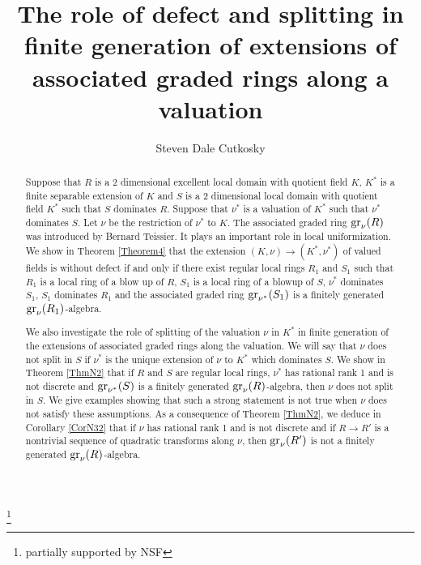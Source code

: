 \documentclass[11pt]{amsart}
\begin{document}
\title{The role of defect and splitting in finite generation of extensions of associated graded rings along a valuation}
\author{Steven Dale Cutkosky}
\thanks{partially supported by NSF}

\address{Steven Dale Cutkosky, Department of Mathematics,
University of Missouri, Columbia, MO 65211, USA}




\begin{abstract}
Suppose that $R$ is a 2 dimensional excellent local domain with quotient field $K$,  $K^*$ is a finite separable extension of $K$ and $S$ is a 2 dimensional local domain with quotient field
$K^*$ such that  $S$ dominates $R$. 
Suppose that $\nu^*$ is a valuation of $K^*$ such that 
 $\nu^*$ dominates $S$. Let $\nu$ be the restriction of $\nu^*$ to $K$.  The associated graded ring ${\rm gr}_{\nu}(R)$  was introduced by Bernard Teissier.  It plays an important role in local uniformization. We show in Theorem \ref{Theorem4} that the extension $(K,\nu)\rightarrow (K^*,\nu^*)$ of valued fields is without defect if and only if there exist regular local rings $R_1$ and $S_1$ such that
 $R_1$ is a local ring of a blow up of $R$, $S_1$ is a local ring of a blowup of $S$, $\nu^*$ dominates $S_1$, $S_1$ dominates $R_1$ and the associated graded ring  ${\rm gr}_{\nu^*}(S_1)$ is a finitely generated ${\rm gr}_{\nu}(R_1)$-algebra.
 
 We also investigate the role of splitting of the valuation $\nu$ in $K^*$ in finite generation of the extensions of associated graded rings along the valuation. We will say that $\nu$ does not split in $S$ if $\nu^*$ is the unique extension of $\nu$ to $K^*$ which  dominates $S$. We show  in Theorem \ref{ThmN2} that if $R$ and $S$ are regular local rings, $\nu^*$ has rational rank 1 and is not discrete and ${\rm gr}_{\nu^*}(S)$ is a finitely generated ${\rm gr}_{\nu}(R)$-algebra, then $\nu$ does not split in $S$. We give examples showing that such a strong statement is not true when $\nu$ does not satisfy these assumptions. As a consequence of Theorem \ref{ThmN2}, we deduce in Corollary \ref{CorN32} that if $\nu$ has rational rank 1 and is not discrete and if $R\rightarrow R'$ is a nontrivial sequence of quadratic transforms along $\nu$, then ${\rm gr}_{\nu}(R')$ is not a finitely generated ${\rm gr}_{\nu}(R)$-algebra. 
\end{abstract}

\maketitle
\end{document}
